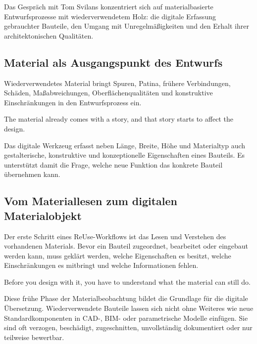 \label{anlage:interview-svilans}

Das Gespräch mit Tom Svilans konzentriert sich auf materialbasierte Entwurfsprozesse mit wiederverwendetem Holz: die digitale Erfassung gebrauchter Bauteile, den Umgang mit Unregelmäßigkeiten und den Erhalt ihrer architektonischen Qualitäten.

\subsection{Material als Ausgangspunkt des Entwurfs}

Wiederverwendetes Material bringt Spuren, Patina, frühere Verbindungen, Schäden, Maßabweichungen, Oberflächenqualitäten und konstruktive Einschränkungen in den Entwurfsprozess ein.

\begin{Blockquote}
The material already comes with a story, and that story starts to affect the design.
\end{Blockquote}

Das digitale Werkzeug erfasst neben Länge, Breite, Höhe und Materialtyp auch gestalterische, konstruktive und konzeptionelle Eigenschaften eines Bauteils. Es unterstützt damit die Frage, welche neue Funktion das konkrete Bauteil übernehmen kann.

\subsection{Vom Materiallesen zum digitalen Materialobjekt}

Der erste Schritt eines ReUse-Workflows ist das Lesen und Verstehen des vorhandenen Materials. Bevor ein Bauteil zugeordnet, bearbeitet oder eingebaut werden kann, muss geklärt werden, welche Eigenschaften es besitzt, welche Einschränkungen es mitbringt und welche Informationen fehlen.

\begin{Blockquote}
Before you design with it, you have to understand what the material can still do.
\end{Blockquote}

Diese frühe Phase der Materialbeobachtung bildet die Grundlage für die digitale Übersetzung. Wiederverwendete Bauteile lassen sich nicht ohne Weiteres wie neue Standardkomponenten in CAD-, BIM- oder parametrische Modelle einfügen. Sie sind oft verzogen, beschädigt, zugeschnitten, unvollständig dokumentiert oder nur teilweise bewertbar.

